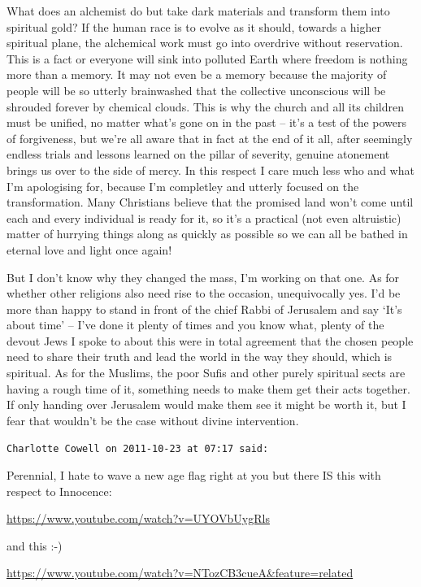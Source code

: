 \begin{footnotesize}
\begin{sffamily}
What does an alchemist do but take dark materials and transform them into spiritual gold? If the human race is to evolve as it should, towards a higher spiritual plane, the alchemical work must go into overdrive without reservation. This is a fact or everyone will sink into polluted Earth where freedom is nothing more than a memory. It may not even be a memory because the majority of people will be so utterly brainwashed that the collective unconscious will be shrouded forever by chemical clouds. This is why the church and all its children must be unified, no matter what's gone on in the past -- it's a test of the powers of forgiveness, but we're all aware that in fact at the end of it all, after seemingly endless trials and lessons learned on the pillar of severity, genuine atonement brings us over to the side of mercy. In this respect I care much less who and what I'm apologising for, because I'm completley and utterly focused on the transformation. Many Christians believe that the promised land won't come until each and every individual is ready for it, so it's a practical (not even altruistic) matter of hurrying things along as quickly as possible so we can all be bathed in eternal love and light once again!

But I don't know why they changed the mass, I'm working on that one. As for whether other religions also need rise to the occasion, unequivocally yes. I'd be more than happy to stand in front of the chief Rabbi of Jerusalem and say `It's about time' -- I've done it plenty of times and you know what, plenty of the devout Jews I spoke to about this were in total agreement that the chosen people need to share their truth and lead the world in the way they should, which is spiritual. As for the Muslims, the poor Sufis and other purely spiritual sects are having a rough time of it, something needs to make them get their acts together. If only handing over Jerusalem would make them see it might be worth it, but I fear that wouldn't be the case without divine intervention.

\hfill

\texttt{Charlotte Cowell on 2011-10-23 at 07:17 said:}

Perennial, I hate to wave a new age flag right at you but there IS this with respect to Innocence:

\url{https://www.youtube.com/watch?v=UYOVbUygRls}

and this :-)

\url{https://www.youtube.com/watch?v=NTozCB3cueA&feature=related}


\end{sffamily}
\end{footnotesize}

